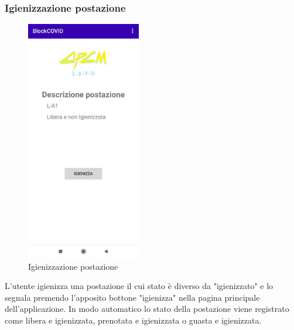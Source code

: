 	\subsubsection{Igienizzazione postazione}
	\begin{figure}[H]
		\centering
		\includegraphics[width=5cm]{res/images/liberaENonIgienizzata.png}
		\caption{Igienizzazione postazione}
	\end{figure}
	L'utente igienizza una postazione il cui stato è diverso da "igienizzato" e lo segnala premendo l'apposito bottone "igienizza" nella pagina principale dell'applicazione. In modo automatico lo stato della postazione viene registrato come libera e igienizzata, prenotata e igienizzata o guasta e igienizzata.
